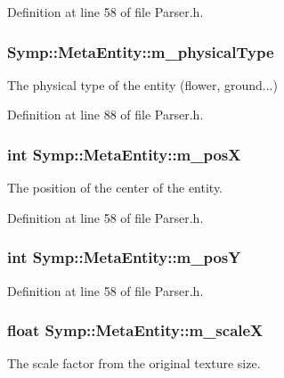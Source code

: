 Definition at line 58 of file Parser.\-h.

\hypertarget{struct_symp_1_1_meta_entity_adec983d933334ee27b5612ea6a67fa13}{
\subsubsection[{m\-\_\-physical\-Type}]{ Symp\-::\-Meta\-Entity\-::m\-\_\-physical\-Type}}\label{struct_symp_1_1_meta_entity_adec983d933334ee27b5612ea6a67fa13}
The physical type of the entity (flower, ground...) 

Definition at line 88 of file Parser.\-h.

\hypertarget{struct_symp_1_1_meta_entity_ae0682dbb5d1c67db0fcb0196d60682cb}{
\subsubsection[{m\-\_\-pos\-X}]{\setlength{\rightskip}{0pt plus 5cm}int Symp\-::\-Meta\-Entity\-::m\-\_\-pos\-X}}\label{struct_symp_1_1_meta_entity_ae0682dbb5d1c67db0fcb0196d60682cb}
The position of the center of the entity. 

Definition at line 58 of file Parser.\-h.

\hypertarget{struct_symp_1_1_meta_entity_aca5081bf5b50d62fb653ca7a93b94649}{
\subsubsection[{m\-\_\-pos\-Y}]{\setlength{\rightskip}{0pt plus 5cm}int Symp\-::\-Meta\-Entity\-::m\-\_\-pos\-Y}}\label{struct_symp_1_1_meta_entity_aca5081bf5b50d62fb653ca7a93b94649}


Definition at line 58 of file Parser.\-h.

\hypertarget{struct_symp_1_1_meta_entity_aebe645a90fb39fd1abefa16335a504eb}{
\subsubsection[{m\-\_\-scale\-X}]{\setlength{\rightskip}{0pt plus 5cm}float Symp\-::\-Meta\-Entity\-::m\-\_\-scale\-X}}\label{struct_symp_1_1_meta_entity_aebe645a90fb39fd1abefa16335a504eb}
The scale factor from the original texture size. 

